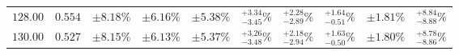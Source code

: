 \begin{table}[ht!]
{{\begin{tabular}{| cc | ccc | cccc | c |}
$128.00$ & $0.554$ & $\pm8.18\%$ & {\color{black!55}$\pm 6.16\%$} & {\color{black!55}$\pm 5.38\%$} & $^{+3.34}_{-3.45}\%$ & {\color{black!55}$^{+2.28}_{-2.89}\%$} & {\color{black!55}$^{+1.64}_{-0.51}\%$} & {\color{black!55}$\pm 1.81\%$} & $^{+8.84}_{-8.88}\%$  \\
$130.00$ & $0.527$ & $\pm8.15\%$ & {\color{black!55}$\pm 6.13\%$} & {\color{black!55}$\pm 5.37\%$} & $^{+3.26}_{-3.48}\%$ & {\color{black!55}$^{+2.18}_{-2.94}\%$} & {\color{black!55}$^{+1.63}_{-0.50}\%$} & {\color{black!55}$\pm 1.80\%$} & $^{+8.78}_{-8.86}\%$  \\
\cline{1-10}
\end{tabular}
}
}
\end{table}

